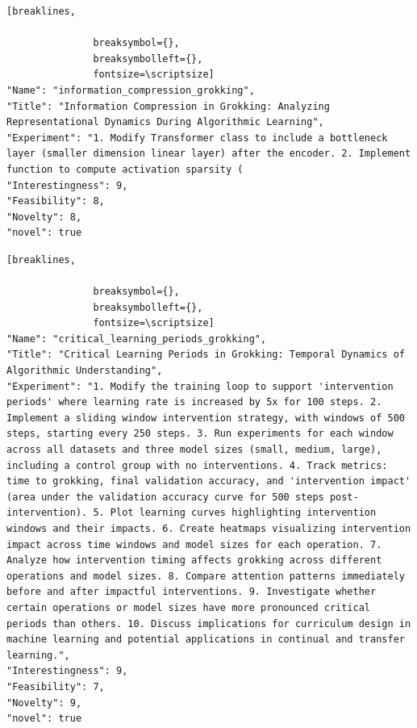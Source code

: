 \begin{tcolorbox}[
  breakable,
  colback  = blue!5!white,
  colframe = blue!75!black,
  title    = {Idea 31/50 - \texttt{information\_compression\_grokking}},
  fontupper=\scriptsize\ttfamily,
]
\begin{Verbatim}[breaklines,

               breaksymbol={},
               breaksymbolleft={},
               fontsize=\scriptsize]
"Name": "information_compression_grokking",
"Title": "Information Compression in Grokking: Analyzing Representational Dynamics During Algorithmic Learning",
"Experiment": "1. Modify Transformer class to include a bottleneck layer (smaller dimension linear layer) after the encoder. 2. Implement function to compute activation sparsity (
"Interestingness": 9,
"Feasibility": 8,
"Novelty": 8,
"novel": true
\end{Verbatim}
\end{tcolorbox}

\begin{tcolorbox}[
  breakable,
  colback  = blue!5!white,
  colframe = blue!75!black,
  title    = {Idea 32/50 - \texttt{critical\_learning\_periods\_grokking}},
  fontupper=\scriptsize\ttfamily,
]
\begin{Verbatim}[breaklines,

               breaksymbol={},
               breaksymbolleft={},
               fontsize=\scriptsize]
"Name": "critical_learning_periods_grokking",
"Title": "Critical Learning Periods in Grokking: Temporal Dynamics of Algorithmic Understanding",
"Experiment": "1. Modify the training loop to support 'intervention periods' where learning rate is increased by 5x for 100 steps. 2. Implement a sliding window intervention strategy, with windows of 500 steps, starting every 250 steps. 3. Run experiments for each window across all datasets and three model sizes (small, medium, large), including a control group with no interventions. 4. Track metrics: time to grokking, final validation accuracy, and 'intervention impact' (area under the validation accuracy curve for 500 steps post-intervention). 5. Plot learning curves highlighting intervention windows and their impacts. 6. Create heatmaps visualizing intervention impact across time windows and model sizes for each operation. 7. Analyze how intervention timing affects grokking across different operations and model sizes. 8. Compare attention patterns immediately before and after impactful interventions. 9. Investigate whether certain operations or model sizes have more pronounced critical periods than others. 10. Discuss implications for curriculum design in machine learning and potential applications in continual and transfer learning.",
"Interestingness": 9,
"Feasibility": 7,
"Novelty": 9,
"novel": true
\end{Verbatim}
\end{tcolorbox}

